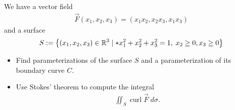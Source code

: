 \documentclass[11pt]{article}
\begin{document}
\begin{exercise}
    We have a vector field 
    \begin{align*}
        \vec F( x_1, x_2, x_3 ) = \left( x_1 x_2, x_2 x_3, x_1 x_3 \right)
    \end{align*}
    and a surface 
    \begin{align*}
        S := \left\{ (x_1,x_2,x_3) \in \bbR^{3} \suchthat* x_1^2 + x_2^2 + x_3^2 = 1, \; x_2 \geq 0, x_3 \geq 0 \right\} 
    \end{align*}
    \begin{itemize}
        \item Find parameterizations of the surface $S$ and a parameterization of its boundary curve $C$.
        \item Use Stokes' theorem to compute the integral 
        \begin{align*}
            \iint_{S} \operatorname{curl} \vec F \;d\sigma.
        \end{align*}
    \end{itemize}
\end{exercise}
\begin{solution}     
\end{solution}













% 
% 
% 
\end{document}
